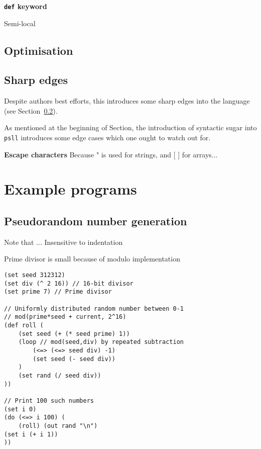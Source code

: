 \documentclass[aip,jcp,reprint,footinbib]{revtex4-1}
\let\tt\texttt
\newcommand\psll{\texttt{psll}\xspace}
\begin{document}
\textbf{\tt{def} keyword}

Semi-local
\subsection{Optimisation}

\subsection{Sharp edges}\label{sec:sharp_edges}


Despite authors best efforts, this introduces some sharp edges into the language (see Section~\ref{sec:sharp_edges}).


As mentioned at the beginning of Section, the introduction of syntactic sugar into \psll introduces some edge cases which one ought to watch out for.

\textbf{Escape characters}
Because " is used for strings, and [ ] for arrays...


\section{Example programs}
\subsection{Pseudorandom number generation}

Note that ... Insensitive to indentation

Prime divisor is small because of modulo implementation

\begin{lstlisting}[language=psll,aboveskip=3mm,belowskip=3mm,
    label=lst:prng,caption={
        \href{https://tio.run/\%23\%23nVbbasMwDH33V/h5JajZYHvZ9iXGUJpAA@tSkm2wr88sX2IpzYgcQ42s5si6W7ff4XTtmmo8X9prO00al9V5URpPdsm2CnfQZuZQ2p@qBdtRCIKx/ZpZhCanzAb3Q5StcIXrKU1OmQ3@DweD0cwaxN0aohW8GOg8cTQRhTho28adn@pHtzfdj/Gyk2T3vb8JzXM7zOob5dmgHdBZ72mU4BBwG7prS/0Trmv6pKrWSWyVaKifo5jIowanFeKwXEvMPxFaxa4ueH17N0x3OZjHC6jFgos7QzTPMRLCvRugPh4NQZcoT7xpN92@YQovFrVDgNasctQeCUmG3WfIHIIcnEOpItmTNobIlqtiq6VjUR2oy5Qh7an/Dk0HFXI/tSsy5V7NMYHBFNflHA04fWLTOl8GOZwURMjxMuWB0HtSe9HJEr4@SiXcNTRSr6q0ograGjCTQbtaFAGBOcvKewkwP4c8kXmaxygkCXIFWGAnw7rgls6wOEeFR1GCwx3Hw8KrjO@xkmcVbTMpwZU4pSQZzWcYUSbxF1H2LkbfHcxaPv2HCj6z7DLBKxjnGN9NCeqj72@bryfoB58r8mFlfUoQjyp0yCur6JhRKb@0m3HERR1cFMc6y1qYsK7jV1lxMxsjbqJpLIOqxmh5exBcieB2pTYKXjDu@DvudmvKBb3O3ZTA9F7jTtMf}{Try it online!}
    }]
(set seed 312312)
(set div (^ 2 16)) // 16-bit divisor
(set prime 7) // Prime divisor

// Uniformly distributed random number between 0-1
// mod(prime*seed + current, 2^16)
(def roll (
    (set seed (+ (* seed prime) 1))
    (loop // mod(seed,div) by repeated subtraction
        (<=> (<=> seed div) -1)
        (set seed (- seed div))
    )
    (set rand (/ seed div))
))

// Print 100 such numbers
(set i 0)
(do (<=> i 100) (
    (roll) (out rand "\n")
(set i (+ i 1))
))
\end{lstlisting}
\end{document}
